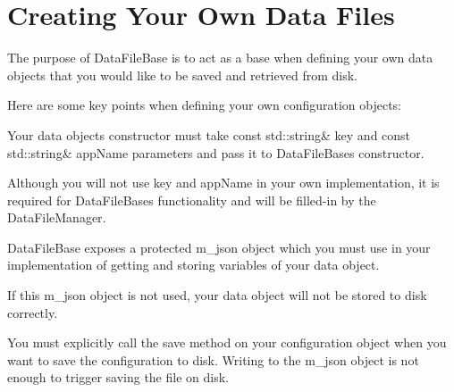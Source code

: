 \chapter{Creating Your Own Data Files}
\hypertarget{md_manual_2datafiles}{}\label{md_manual_2datafiles}
\label{md_manual_2datafiles_autotoc_md0}%
%
The purpose of {\ttfamily Data\+File\+Base} is to act as a base when defining your own data objects that you would like to be saved and retrieved from disk.

Here are some key points when defining your own configuration objects\+:
\begin{DoxyItemize}
\item Your data object\textquotesingle{}s constructor must take {\ttfamily const std\+::string\& key} and {\ttfamily const std\+::string\& app\+Name} parameters and pass it to {\ttfamily Data\+File\+Base}\textquotesingle{}s constructor.
\begin{DoxyItemize}
\item Although you will not use {\ttfamily key} and {\ttfamily app\+Name} in your own implementation, it is required for {\ttfamily Data\+File\+Base}\textquotesingle{}s functionality and will be filled-\/in by the {\ttfamily Data\+File\+Manager}.
\end{DoxyItemize}
\item {\ttfamily Data\+File\+Base} exposes a protected {\ttfamily m\+\_\+json} object which you must use in your implementation of getting and storing variables of your data object.
\begin{DoxyItemize}
\item If this {\ttfamily m\+\_\+json} object is not used, your data object will not be stored to disk correctly.
\end{DoxyItemize}
\item You must explicitly call the {\ttfamily save} method on your configuration object when you want to save the configuration to disk. Writing to the {\ttfamily m\+\_\+json} object is not enough to trigger saving the file on disk.
\end{DoxyItemize}

